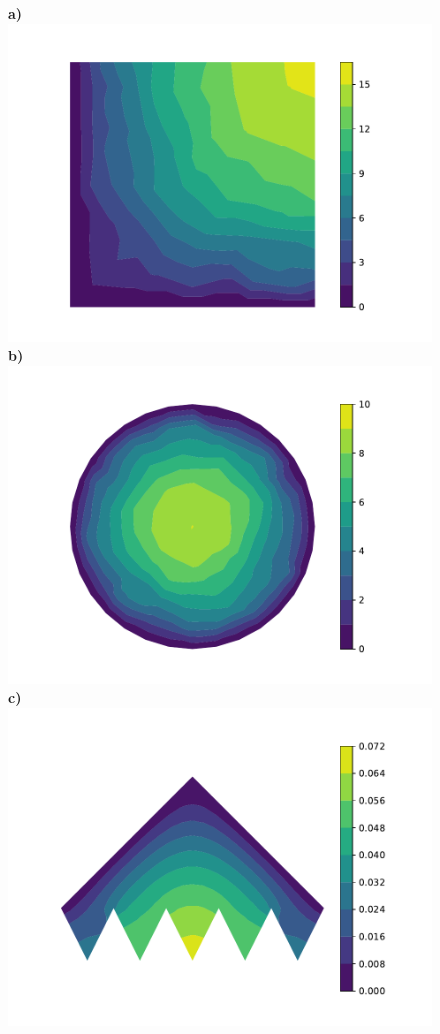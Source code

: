 \documentclass[aps, 12pt]{revtex4}
\begin{document}
\begin{figure}
    \textbf{a)}
    \includegraphics[width=\linewidth]{square.pdf}
    \endminipage\hfill
    \textbf{b)}
    \includegraphics[width=\linewidth]{circle.pdf}
    \endminipage\hfill
    \textbf{c)}
    \includegraphics[width=\linewidth]{generic.pdf}

\end{figure}
\end{document}
